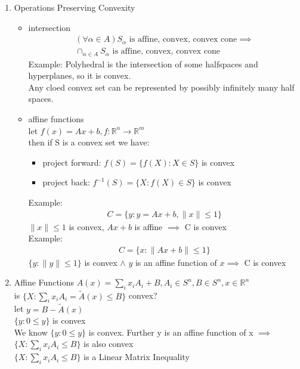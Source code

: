 \documentclass[12pt,letter]{article}
\newcommand{\R}{\mathbb{R}}
\newcommand{\norm}[1]{\|#1\|}
\begin{document}
\begin{enumerate}
  \pagebreak
  
\item Operations Preserving Convexity
  \begin{itemize}
  \item intersection
    \begin{align*}
      (\forall \alpha \in A) S_{\alpha}\text{ is affine, convex, convex cone} \implies\\
      \cap_{\alpha \in A} S_{\alpha} \text{ is affine, convex, convex cone}
    \end{align*}
    Example: Polyhedral is the intersection of some halfspaces and hyperplanes, so it is convex.\\
    Any cloed convex set can be represented by possibly infinitely many half spaces.
  \item affine functions\\
    let $f(x)=Ax+b, f:\R^n \to \R^m$\\
    then if S is a convex set we have:
    \begin{itemize}
    \item project forward: $f(S) = \{ f(X) : X \in S \}$ is convex
    \item project back: $f^{-1}(S) = \{ X : f(X) \in S \}$ is convex
    \end{itemize}
    Example:
    \begin{align*}
      C = \{ y : y=Ax+b, \norm{x} \leq 1\}
    \end{align*}
    $\norm{x} \leq 1$ is convex, $Ax+b$ is affine $\implies$ C is convex\\
    Example:
    \begin{align*}
      C = \{ x : \norm{Ax+b} \leq 1 \}
    \end{align*}
    $\{y: \norm{y} \leq 1 \}$ is convex $\wedge$ $y$ is an affine function of $x \implies$ C is convex\\
  \end{itemize}
\item Affine Functions
  $A(x)=\sum_i x_i A_i + B, A_i\in S^n, B \in S^n, x\in \R^n$\\
  is $\{X : \sum_i x_i A_i = \tilde{A}(x)\leq B \}$ convex?\\
  let $y = B-\tilde{A}(x)$\\
  $\{y: 0 \leq y \}$ is convex\\
  We know $\{y: 0 \leq y \}$ is convex. Further y is an affine function of x $\implies$\\
  $\{X : \sum_i x_i A_i \leq B \}$ is also convex\\
  $\{X : \sum_i x_i A_i \leq B \}$ is a Linear Matrix Inequality


\end{enumerate}
\end{document}
